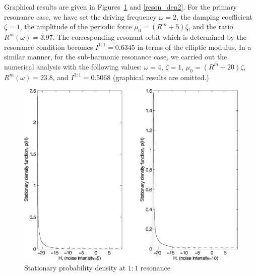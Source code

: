 Graphical results are given in Figures~\ref{reson_den1} and \ref{reson_den2}. For the primary resonance case, we have set the driving frequency $\omega=2$, the damping coefficient $\zeta=1$, the amplitude of the periodic force $\mu_0 = (R^m + 5) \zeta$, and the ratio $R^m(\omega)=3.97$. The corresponding resonant orbit which is determined by the resonance condition becomes $I^{1:1}=0.6345$ in terms of the elliptic modulus. In a similar manner, for the sub-harmonic resonance case, we carried out the numerical analysis with the following values: $\omega=4$, $\zeta=1$, $\mu_0 = (R^m + 20) \zeta$, $R^m(\omega)=23.8$, and $I^{3:1}=0.5068$ (graphical results are omitted.)
\begin{figure}[htbp]
\begin{center}
\includegraphics[width=\textwidth]{figures/res_den1}
\caption{Stationary probability density at $1:1$ resonance}
\label{reson_den1}
\end{center}
\end{figure}
